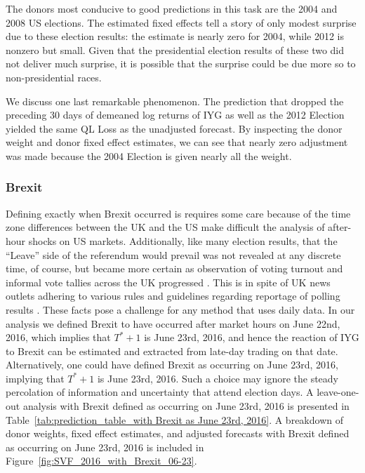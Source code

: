 \documentclass[11pt,3p,review,authoryear]{elsarticle}
\theoremstyle{definition}
\begin{document}
The donors most conducive to good predictions in this task are the 2004 and 2008 US elections.  The estimated fixed effects tell a story of only modest surprise due to these election results: the estimate is nearly zero for 2004, while 2012 is nonzero but small.  Given that the presidential election results of these two did not deliver much surprise, it is possible that the surprise could be due more so to non-presidential races.

We discuss one last remarkable phenomenon.  The prediction that dropped the preceding 30 days of demeaned log returns of IYG as well as the 2012 Election yielded the same QL Loss as the unadjusted forecast.  By inspecting the donor weight and donor fixed effect estimates, we can see that nearly zero adjustment was made because the 2004 Election is given nearly all the weight.

\subsubsection{Brexit}

Defining exactly when Brexit occurred is requires some care because of the time zone differences between the UK and the US make difficult the analysis of after-hour shocks on US markets.  Additionally, like many election results, that the ``Leave'' side of the referendum would prevail was not revealed at any discrete time, of course, but became more certain as observation of voting turnout and informal vote tallies across the UK progressed \citep{BBC_News_2016}.  This is in spite of UK news outlets adhering to various rules and guidelines regarding reportage of polling results \citep{Bailey_2024}.  These facts pose a challenge for any method that uses daily data.  In our analysis we defined Brexit
to have occurred after market hours on June 22nd, 2016, which implies that $T^{*}+1$ is June 23rd, 2016, and hence the reaction of IYG to Brexit can be estimated and extracted from late-day trading on that date. Alternatively, one could have defined Brexit as occurring on June 23rd, 2016, implying that $T^{*}+1$ is June 23rd, 2016. Such a choice may ignore the steady percolation of information and uncertainty that attend election days. A leave-one-out analysis with Brexit defined as occurring on June 23rd, 2016 is presented in Table~\ref{tab:prediction_table_with Brexit as June 23rd, 2016}. A breakdown of donor weights, fixed effect estimates, and adjusted forecasts with Brexit defined as occurring on June 23rd, 2016 is included in Figure~\ref{fig:SVF_2016_with_Brexit_06-23}. 
\end{document}
